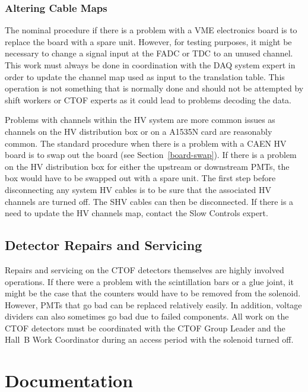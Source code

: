 \documentclass[12pt]{article}
\begin{document}
\subsubsection{Altering Cable Maps}

The nominal procedure if there is a problem with a VME electronics board is to 
replace the board with a spare unit. However, for testing purposes, it might be 
necessary to change a signal input at the FADC or TDC to an unused channel. This 
work must always be done in coordination with the DAQ system expert in order to 
update the channel map used as input to the translation table. This operation is 
not something that is normally done and should not be attempted by shift workers 
or CTOF experts as it could lead to problems decoding the data.

Problems with channels within the HV system are more common issues as channels on 
the HV distribution box or on a A1535N card are reasonably common. The standard 
procedure when there is a problem with a CAEN HV board is to swap out the board 
(see Section~\ref{board-swap}). If there is a problem on the HV distribution box 
for either the upstream or downstream PMTs, the box would have to be swapped out 
with a spare unit. The first step before disconnecting any system HV cables is to 
be sure that the associated HV channels are turned off. The SHV cables can then be 
disconnected. If there is a need to update the HV channels map, contact the Slow 
Controls expert.

\subsection{Detector Repairs and Servicing}

Repairs and servicing on the CTOF detectors themselves are highly involved operations. 
If there were a problem with the scintillation bars or a glue joint, it might be the 
case that the counters would have to be removed from the solenoid. However, PMTs that 
go bad can be replaced relatively easily. In addition, voltage dividers can also 
sometimes go bad due to failed components. All work on the CTOF detectors must be 
coordinated with the CTOF Group Leader and the Hall~B Work Coordinator during an 
access period with the solenoid turned off.

\clearpage

\vfil
\eject

\section{Documentation}
\end{document}
